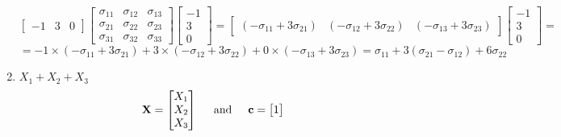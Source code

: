 \begin{enumerate}[label=(\alph*)]
\[                \begin{bmatrix}
                    -1 & 3 & 0
                \end{bmatrix}
                \begin{bmatrix}
                    \sigma_{11} & \sigma_{12} & \sigma_{13} \\
                    \sigma_{21} & \sigma_{22} & \sigma_{23} \\
                    \sigma_{31} & \sigma_{32} & \sigma_{33}
                \end{bmatrix}
                \begin{bmatrix}
                    -1 \\
                    3 \\
                    0
                \end{bmatrix}
                =
                \begin{bmatrix}
                    \left(-\sigma_{11} + 3\sigma_{21}\right) &
                    \left(-\sigma_{12} + 3\sigma_{22}\right) &
                    \left(-\sigma_{13} + 3\sigma_{23}\right)
                \end{bmatrix}
                \begin{bmatrix}
                    -1 \\
                    3 \\
                    0
                \end{bmatrix}
                =
            \]
            \[
                =
                -1 \times \left(-\sigma_{11} + 3\sigma_{21}\right) + 3 \times \left(-\sigma_{12} + 3\sigma_{22}\right)
                    + 0 \times \left(-\sigma_{13} + 3\sigma_{23}\right)
                =
                \sigma_{11} + 3(\sigma_{21} - \sigma_{12}) + 6 \sigma_{22}
            \]
            \item $X_1 + X_2 + X_3$
            \[
                \textbf{X}
                =
                \begin{bmatrix}
                    X_1 \\
                    X_2 \\
                    X_3
                \end{bmatrix}
                \hspace{0.2in}\text{and}\hspace{0.2in}
                \textbf{c}
                =
                \begin{bmatrix}
                    1 \\

\end{bmatrix}\]
\end{enumerate}
